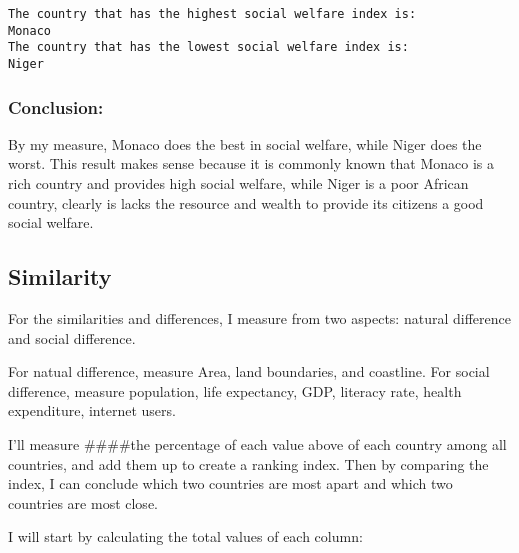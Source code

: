 \documentclass{article}
\begin{document}
    \begin{Verbatim}[commandchars=\\\{\}]
The country that has the highest social welfare index is:
Monaco
The country that has the lowest social welfare index is:
Niger
    \end{Verbatim}

    \subsubsection{Conclusion:}\label{conclusion}

By my measure, Monaco does the best in social welfare, while Niger does
the worst. This result makes sense because it is commonly known that
Monaco is a rich country and provides high social welfare, while Niger
is a poor African country, clearly is lacks the resource and wealth to
provide its citizens a good social welfare.

    \subsection{Similarity}\label{similarity}

    For the similarities and differences, I measure from two aspects:
natural difference and social difference.

For natual difference, measure Area, land boundaries, and coastline. For
social difference, measure population, life expectancy, GDP, literacy
rate, health expenditure, internet users.

I'll measure \#\#\#\#the percentage of each value above of each country
among all countries, and add them up to create a ranking index. Then by
comparing the index, I can conclude which two countries are most apart
and which two countries are most close.

I will start by calculating the total values of each column:
\end{document}
